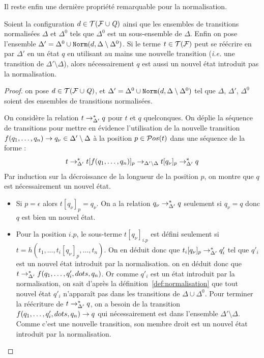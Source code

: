 Il reste enfin une dernière propriété remarquable pour la normalisation. 
\begin{property}
  \label{prop:norm_transitions}
  Soient la configuration $d \in \mathcal{ T(F \cup \mathit Q)}$ ainsi que les ensembles de transitions normalisées $\Delta$ et $\Delta^0$ tels que $\Delta^0$ est un sous-ensemble de $\Delta$.
  Enfin on pose l'ensemble $\Delta'= \Delta^0 \cup \mathtt{Norm}(d, \Delta\setminus\Delta^0)$.
  Si le terme $t \in \mathcal{T(F)}$ peut se réécrire en par $\Delta'$ en un état $q$ en utilisant au mains une nouvelle transition (\textit{i.e.} une transition de $\Delta' \setminus \Delta$),
  alors nécessairement $q$ est aussi un nouvel état introduit pas la normalisation.
\end{property}

\begin{proof}
  on pose $d \in \mathcal{ T(F \cup \mathit Q)}$, et $\Delta'= \Delta^0 \cup \mathtt{Norm}(d, \Delta\setminus\Delta^0)$ tel que $\Delta$, $\Delta'$, $\Delta^0$ soient 
  des ensembles de transitions normalisées.
  
  On considère la relation $t \rightarrow^*_{\Delta'} q$ pour $t$ et $q$ quelconques.
  On déplie la séquence de transitions pour mettre en évidence l'utilisation 
  de la nouvelle transition $f(q_1,\dots,q_n) \rightarrow q_\nu \in \Delta'\setminus\Delta$
  à la position $p \in \mathcal{ P}os(t)$ dans une séquence de la forme :
  \[t \rightarrow^*_{\Delta'} t[f(q_1,\dots,q_n)]_p \rightarrow_{\Delta'\setminus\Delta} t[q_\nu]_p \rightarrow^*_{\Delta'} q\]
  Par induction sur la décroissance de la longueur de la position $p$, on montre que $q$ est nécessairement un nouvel état.
  \begin{itemize}
  \item Si $p = \epsilon$ alors $t[q_\nu]_p = q_\nu$. On a la relation $q_\nu \rightarrow^*_{\Delta'} q$
    seulement si $q_\nu = q$ donc $q$ est bien un nouvel état. 
    
  \item Pour la position $i.p$, le sous-terme $t[q_\nu]_{i.p}$ est défini seulement si 
    $t = h(t_1,\dots, t_i[q_\nu]_p, \dots,t_n)$. On en déduit donc que $t_i[q_\nu]_p \rightarrow^*_{\Delta'} q'_i$
    tel que $q'_i$ est un nouvel état introduit par la normalisation.
    on en déduit donc que $t \rightarrow^*_{\Delta'} f(q_1,\dots,q'_i,dots,q_n)$. Or comme $q'_i$ est un 
    état introduit par la normalisation, on sait d'après la définition~\ref{def:normalisation}
    que tout nouvel état $q'_i$ n'apparaît pas dans les transitions de $\Delta \cup \Delta^0$.
    Pour terminer la réécriture de $t \rightarrow_{\Delta'}^* q$, on a besoin de la transition
    $f(q_1,\dots,q'_i,dots,q_n) \rightarrow q$ qui nécessairement est dans l'ensemble $\Delta'\setminus\Delta$.
    Comme c'est une nouvelle transition, son membre droit est un nouvel état introduit par la normalisation.
  \end{itemize}
\end{proof}

